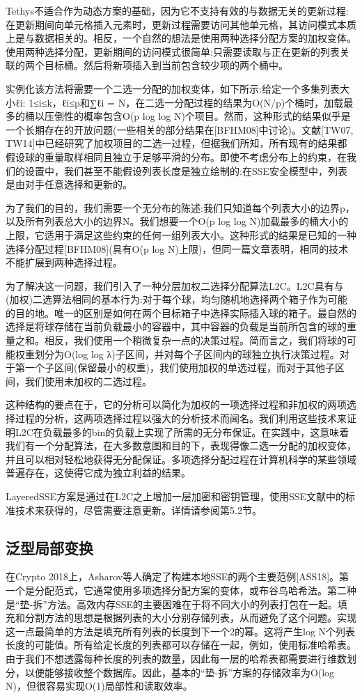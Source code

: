 \documentclass[UTF8]{article}
\begin{document}
Tethys不适合作为动态方案的基础，因为它不支持有效的与数据无关的更新过程:在更新期间向单元格插入元素时，更新过程需要访问其他单元格，其访问模式本质上是与数据相关的。相反，一个自然的想法是使用两种选择分配方案的加权变体。使用两种选择分配，更新期间的访问模式很简单:只需要读取与正在更新的列表关联的两个目标桶。然后将新项插入到当前包含较少项的两个桶中。

实例化该方法将需要一个二选一分配的加权变体，如下所示:给定一个多集列表大小{ℓi: 1≤i≤k}，ℓi≤p和∑ℓi = N，在二选一分配过程的结果为O(N/p)个桶时，加载最多的桶以压倒性的概率包含O(p log log N)个项目。然而，这种形式的结果似乎是一个长期存在的开放问题(一些相关的部分结果在[BFHM08]中讨论)。文献[TW07, TW14]中已经研究了加权项目的二选一过程，但据我们所知，所有现有的结果都假设球的重量取样相同且独立于足够平滑的分布。即使不考虑分布上的约束，在我们的设置中，我们甚至不能假设列表长度是独立绘制的:在SSE安全模型中，列表是由对手任意选择和更新的。

为了我们的目的，我们需要一个无分布的陈述:我们只知道每个列表大小的边界p，以及所有列表总大小的边界N。我们想要一个O(p log log N)加载最多的桶大小的上限，它适用于满足这些约束的任何一组列表大小。这种形式的结果是已知的一种选择分配过程[BFHM08](具有O(p log N)上限)，但同一篇文章表明，相同的技术不能扩展到两种选择过程。

为了解决这一问题，我们引入了一种分层加权二选择分配算法L2C。L2C具有与(加权)二选算法相同的基本行为:对于每个球，均匀随机地选择两个箱子作为可能的目的地。唯一的区别是如何在两个目标箱子中选择实际插入球的箱子。最自然的选择是将球存储在当前负载最小的容器中，其中容器的负载是当前所包含的球的重量之和。相反，我们使用一个稍微复杂一点的决策过程。简而言之，我们将球的可能权重划分为O(log log λ)子区间，并对每个子区间内的球独立执行决策过程。对于第一个子区间(保留最小的权重)，我们使用加权的单选过程，而对于其他子区间，我们使用未加权的二选过程。

这种结构的要点在于，它的分析可以简化为加权的一项选择过程和非加权的两项选择过程的分析，这两项选择过程以强大的分析技术而闻名。我们利用这些技术来证明L2C在负载最多的bin的负载上实现了所需的无分布保证。在实践中，这意味着我们有一个分配算法，在大多数意图和目的下，表现得像二选一分配的加权变体，并且可以相对轻松地获得无分配保证。多项选择分配过程在计算机科学的某些领域普遍存在，这使得它成为独立利益的结果。

LayeredSSE方案是通过在L2C之上增加一层加密和密钥管理，使用SSE文献中的标准技术来获得的，尽管需要注意更新。详情请参阅第5.2节。


\subsection{泛型局部变换}
在Crypto 2018上，Asharov等人确定了构建本地SSE的两个主要范例[ASS18]。第一个是分配范式，它通常使用多项选择分配方案的变体，或布谷鸟哈希法。第二种是“垫-拆”方法。高效内存SSE的主要困难在于将不同大小的列表打包在一起。填充和分割方法的思想是根据列表的大小分别存储列表，从而避免了这个问题。实现这一点最简单的方法是填充所有列表的长度到下一个2的幂。这将产生log N个列表长度的可能值。所有给定长度的列表都可以存储在一起，例如，使用标准哈希表。由于我们不想透露每种长度的列表的数量，因此每一层的哈希表都需要进行维数划分，以便能够接收整个数据库。因此，基本的“垫-拆”方案的存储效率为O(log N)，但很容易实现O(1)局部性和读取效率。
\end{document}
